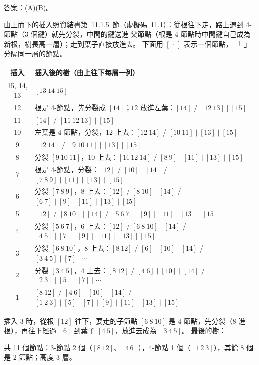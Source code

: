 \begin{pastsoln}
答案：(A)(B)。

由上而下的插入照資結書第~11.1.5~節（虛擬碼~11.1）：從根往下走，路上遇到 4-節點（3 個鍵）就先分裂，中間的鍵送進
父節點（根是 4-節點時中間鍵自己成為新根，樹長高一層）；走到葉子直接放進去。 下面用 $[\,\cdot\,]$ 表示一個節點，
「$\mid$」分隔同一層的節點。

\begin{center}
\small
\begin{tabular}{cl}
\toprule
插入 & 插入後的樹（由上往下每層一列） \\
\midrule
15, 14, 13 & $[13\ 14\ 15]$ \\
12 & 根是 4-節點，先分裂成 $[14]$；$12$ 放進左葉：$[14]$ / $[12\ 13] \mid [15]$ \\
11 & $[14]$ / $[11\ 12\ 13] \mid [15]$ \\
10 & 左葉是 4-節點，分裂，$12$ 上去：$[12\ 14]$ / $[10\ 11] \mid [13] \mid [15]$ \\
9 & $[12\ 14]$ / $[9\ 10\ 11] \mid [13] \mid [15]$ \\
8 & 分裂 $[9\ 10\ 11]$，$10$ 上去：$[10\ 12\ 14]$ / $[8\ 9] \mid [11] \mid [13] \mid [15]$ \\
7 & 根是 4-節點，分裂：$[12]$ / $[10] \mid [14]$ / $[7\ 8\ 9] \mid [11] \mid [13] \mid [15]$ \\
6 & 分裂 $[7\ 8\ 9]$，$8$ 上去：$[12]$ / $[8\ 10] \mid [14]$ / $[6\ 7] \mid [9] \mid [11] \mid [13] \mid [15]$ \\
5 & $[12]$ / $[8\ 10] \mid [14]$ / $[5\ 6\ 7] \mid [9] \mid [11] \mid [13] \mid [15]$ \\
4 & 分裂 $[5\ 6\ 7]$，$6$ 上去：$[12]$ / $[6\ 8\ 10] \mid [14]$ / $[4\ 5] \mid [7] \mid [9] \mid [11] \mid [13] \mid [15]$ \\
3 & 分裂 $[6\ 8\ 10]$，$8$ 上去：$[8\ 12]$ / $[6] \mid [10] \mid [14]$ / $[3\ 4\ 5] \mid [7] \mid \cdots$ \\
2 & 分裂 $[3\ 4\ 5]$，$4$ 上去：$[8\ 12]$ / $[4\ 6] \mid [10] \mid [14]$ / $[2\ 3] \mid [5] \mid [7] \mid \cdots$ \\
1 & $[8\ 12]$ / $[4\ 6] \mid [10] \mid [14]$ / $[1\ 2\ 3] \mid [5] \mid [7] \mid [9] \mid [11] \mid [13] \mid [15]$ \\
\bottomrule
\end{tabular}
\end{center}
插入 3 時，從根 $[12]$ 往下，要走的子節點 $[6\ 8\ 10]$ 是 4-節點，先分裂（$8$ 進根），再往下經過 $[6]$ 到葉子
$[4\ 5]$，放進去成為 $[3\ 4\ 5]$。 最後的樹：
\begin{center}
\end{center}
共 11 個節點：3-節點 2 個（$[8\ 12]$、$[4\ 6]$），4-節點 1 個（$[1\ 2\ 3]$），其餘 8 個是 2-節點；高度 3 層。


\end{pastsoln}
